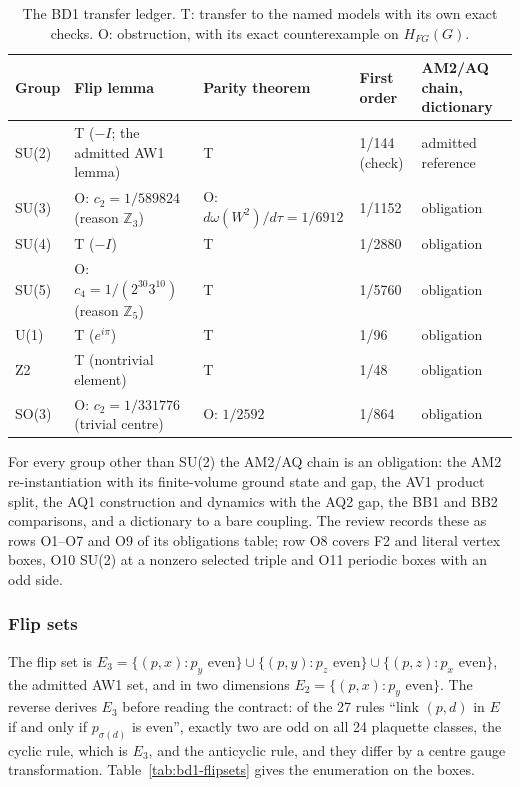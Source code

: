 \begin{table}[htbp]
\centering\small
\caption{The BD1 transfer ledger. T: transfer to the named models with its own
exact checks. O: obstruction, with its exact counterexample on
$H_{FG}(G)$.}
\label{tab:bd1-ledger}
\begin{tabularx}{\linewidth}{@{}l>{\raggedright\arraybackslash}X>{\raggedright\arraybackslash}X ll@{}}
\toprule
Group & Flip lemma & Parity theorem & First order & AM2/AQ chain, dictionary\\
\midrule
SU(2) & T ($-I$; the admitted AW1 lemma) & T & 1/144 (check) & admitted reference\\
SU(3) & O: $c_2=1/589824$ (reason $\mathbb Z_3$) & O: $d\omega(W^2)/d\tau=1/6912$ & 1/1152 & obligation\\
SU(4) & T ($-I$) & T & 1/2880 & obligation\\
SU(5) & O: $c_4=1/(2^{30}3^{10})$ (reason $\mathbb Z_5$) & T & 1/5760 & obligation\\
U(1) & T ($e^{i\pi}$) & T & 1/96 & obligation\\
Z2 & T (nontrivial element) & T & 1/48 & obligation\\
SO(3) & O: $c_2=1/331776$ (trivial centre) & O: $1/2592$ & 1/864 & obligation\\
\bottomrule
\end{tabularx}
\end{table}

For every group other than SU(2) the AM2/AQ chain is an obligation: the AM2
re-instantiation with its finite-volume ground state and gap, the AV1
product split, the AQ1 construction and dynamics with the AQ2 gap, the BB1
and BB2 comparisons, and a dictionary to a bare coupling. The review records these as rows
O1--O7 and O9 of its obligations table; row O8 covers F2 and literal vertex
boxes, O10 SU(2) at a nonzero selected triple and O11 periodic boxes with an
odd side.

\subsubsection{Flip sets}
\label{sec:bd1-flipsets}
The flip set is
$E_3=\{(p,x):p_y\text{ even}\}\cup\{(p,y):p_z\text{ even}\}\cup\{(p,z):p_x\text{ even}\}$,
the admitted AW1 set, and in two dimensions $E_2=\{(p,x):p_y\text{ even}\}$.
The reverse derives $E_3$ before reading the contract: of the 27 rules ``link
$(p,d)$ in $E$ if and only if $p_{\sigma(d)}$ is even'', exactly two are odd on
all 24 plaquette classes, the cyclic rule, which is $E_3$, and the
anticyclic rule, and they differ by a centre gauge transformation.
Table~\ref{tab:bd1-flipsets} gives the enumeration on the boxes.

